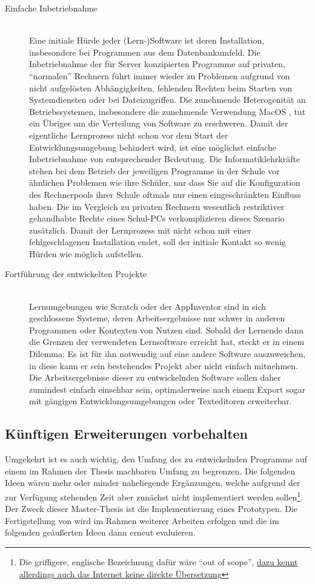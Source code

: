 \begin{description}
\item[Einfache Inbetriebnahme] \hfill \\
  Eine initiale Hürde jeder (Lern-)Software ist deren Installation, insbesondere bei Programmen aus dem Datenbankumfeld. Die Inbetriebnahme der für Server konzipierten Programme auf privaten, ``normalen'' Rechnern führt immer wieder zu Problemen aufgrund von nicht aufgelösten Abhängigkeiten, fehlenden Rechten beim Starten von Systemdiensten oder bei Dateizugriffen. Die zunehmende Heterogenität an Betriebssystemen, insbesondere die zunehmende Verwendung MacOS \cite{statista-os-verbreitung}, tut ein Übriges um die Verteilung von Software zu erschweren. Damit der eigentliche Lernprozess nicht schon vor dem Start der Entwicklungsumgebung behindert wird, ist eine möglichst einfache Inbetriebnahme von entsprechender Bedeutung. Die Informatiklehrkräfte stehen bei dem Betrieb der jeweiligen Programme in der Schule vor ähnlichen Problemen wie ihre Schüler, nur dass Sie auf die Konfiguration des Rechnerpools ihrer Schule oftmals nur einen eingeschränkten Einfluss haben. Die im Vergleich zu privaten Rechnern wesentlich restriktiver gehandhabte Rechte eines Schul-PCs verkomplizieren dieses Szenario zusätzlich. Damit der Lernprozess mit \idename{} nicht schon mit einer fehlgeschlagenen Installation endet, soll der initiale Kontakt so wenig Hürden wie möglich aufstellen.
\item[Fortführung der entwickelten Projekte] \hfill \\
  Lernumgebungen wie Scratch oder der AppInventor sind in sich geschlossene Systeme, deren Arbeitsergebnisse nur schwer in anderen Programmen oder Kontexten von Nutzen sind. Sobald der Lernende dann die Grenzen der verwendeten Lernsoftware erreicht hat, steckt er in einem Dilemma: Es ist für ihn notwendig auf eine andere Software auszuweichen, in diese kann er sein bestehendes Projekt aber nicht einfach mitnehmen. Die Arbeitsergebnisse dieser zu entwickelnden Software sollen daher zumindest einfach einsehbar sein, optimalerweise nach einem Export sogar mit gängigen Entwicklungsumgebungen oder Texteditoren erweiterbar.
\end{description}

\subsection{Künftigen Erweiterungen vorbehalten}
\label{sec:out-of-scope}

Umgekehrt ist es auch wichtig, den Umfang des zu entwickelnden Programms auf einem im Rahmen der Thesis machbaren Umfang zu begrenzen. Die folgenden Ideen wären mehr oder minder naheliegende Ergänzungen, welche aufgrund der zur Verfügung stehenden Zeit aber zunächst nicht implementiert werden sollen\footnote{Die griffigere, englische Bezeichnung dafür wäre "`out of scope"', \href{http://german.stackexchange.com/questions/31085/german-equivalent-to-out-of-scope/}{dazu kennt allerdings auch das Internet keine direkte Übersetzung}}. Der Zweck dieser Master-Thesis ist die Implementierung eines Prototypen. Die Fertigstellung von \idename{} wird im Rahmen weiterer Arbeiten erfolgen und die im folgenden geäußerten Ideen dann erneut evaluieren.

